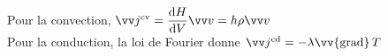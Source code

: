 ﻿\documentclass[a4paper]{article}
\begin{document}
\pagestyle{fancy}
\fancyhf{}
\setlength{\headheight}{15pt}

\begin{center}
	\large{}
\end{center}


\begin{center}
\end{center}

Pour la convection, \( \vv j^{\mathrm{cv}} = \dfrac{\mathrm{d}H}{\mathrm{d}V} \vv v = h\rho \vv v \)\\
Pour la conduction, la loi de Fourier donne \( \vv j^{\mathrm{cd}} = -\lambda \vv{\mathrm{grad}}\,T \)
\end{document}

